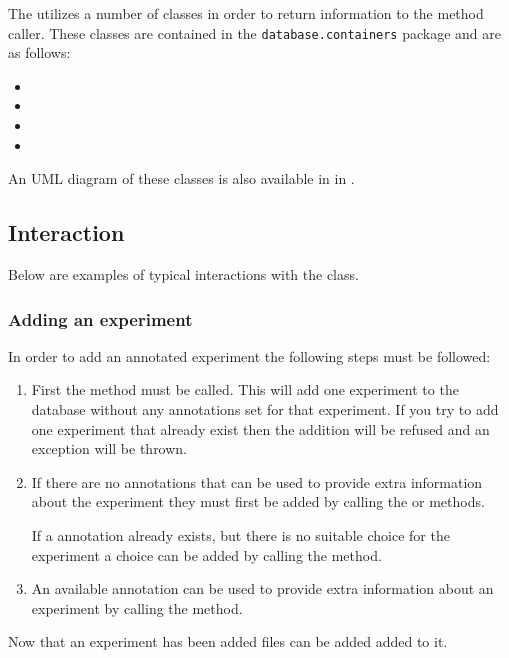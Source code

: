 The  utilizes a number of classes in order to return information to the method caller. These classes are contained in the \texttt{database.containers} package and are as follows:
\begin{itemize}
\item {}
\item {}
\item {}
\item {}
\end{itemize}

An UML diagram of these classes is also available in  in .

\subsection{Interaction}
Below are examples of typical interactions with the  class.

\subsubsection{Adding an experiment}
In order to add an annotated experiment the following steps must be followed:
\begin{enumerate}
\item First the  method must be called. This will add one experiment to the database without any annotations set for that experiment. If you try to add one experiment that already exist then the addition will be refused and an exception will be thrown.

\item If there are no annotations that can be used to provide extra information about the experiment they must first be added by calling the  or  methods.

\subitem If a  annotation already exists, but there is no suitable choice for the experiment a choice can be added by calling the  method.

\item An available annotation can be used to provide extra information about an experiment by calling the  method.
\end{enumerate}

Now that an experiment has been added files can be added added to it.


